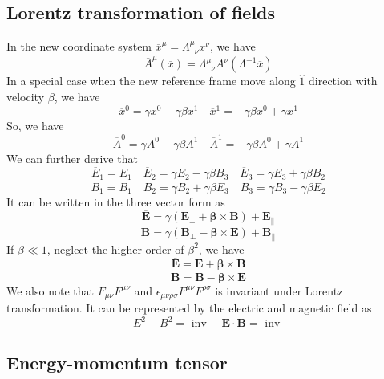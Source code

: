 \documentclass[cyan]{elegantnote}
\begin{document}
\subsection{Lorentz transformation of fields}

In the new coordinate system $\overline{x}^{\mu} = \Lambda^{\mu}_{\phantom{\mu}\nu}x^{\nu}$, we have
\[\overline{A}^{\mu}(\overline{x}) = \Lambda^{\mu}_{\phantom{\mu}\nu}A^{\nu}(\Lambda^{-1}\overline{x})\]
In a special case when the new reference frame move along $\hat{1}$ direction with velocity $\beta$, we have
\[\overline{x}^{0} = \gamma x^0 - \gamma \beta x^1 \quad \overline{x}^{1} = -\gamma \beta x^0 + \gamma x^1\]
So, we have
\[\overline{A}^{0} = \gamma A^0 - \gamma \beta A^1 \quad \overline{A}^{1} = -\gamma \beta A^0 + \gamma A^1\]
We can further derive that
\[\overline{E}_1 = E_1 \quad \overline{E}_2 = \gamma E_2 - \gamma \beta B_3 \quad \overline{E}_3 = \gamma E_3 + \gamma \beta B_2\]
\[\overline{B}_1 = B_1 \quad \overline{B}_2 = \gamma B_2 + \gamma \beta E_3 \quad \overline{B}_3 = \gamma B_3 - \gamma \beta E_2\]
It can be written in the three vector form as
\[\bm{\overline{E}} = \gamma(\bm{E}_{\perp} + \bm{\beta} \times \bm{B}) + \bm{E}_{\parallel}\]
\[\bm{\overline{B}} = \gamma(\bm{B}_{\perp} - \bm{\beta} \times \bm{E}) + \bm{B}_{\parallel}\]
If $\beta \ll 1$, neglect the higher order of $\beta^2$, we have
\[\bm{\overline{E}} = \bm{E} + \bm{\beta} \times \bm{B}\]
\[\bm{\overline{B}} = \bm{B} - \bm{\beta} \times \bm{E}\]
We also note that $F_{\mu\nu}F^{\mu\nu}$ and $\epsilon_{\mu\nu\rho\sigma}F^{\mu\nu}F^{\rho\sigma}$ is invariant under Lorentz transformation. It can be represented by the electric and magnetic field as
\[E^2 - B^2 = \mbox{ inv } \quad \bm{E} \cdot \bm{B} = \mbox{ inv }\]

\subsection{Energy-momentum tensor}
\end{document}
